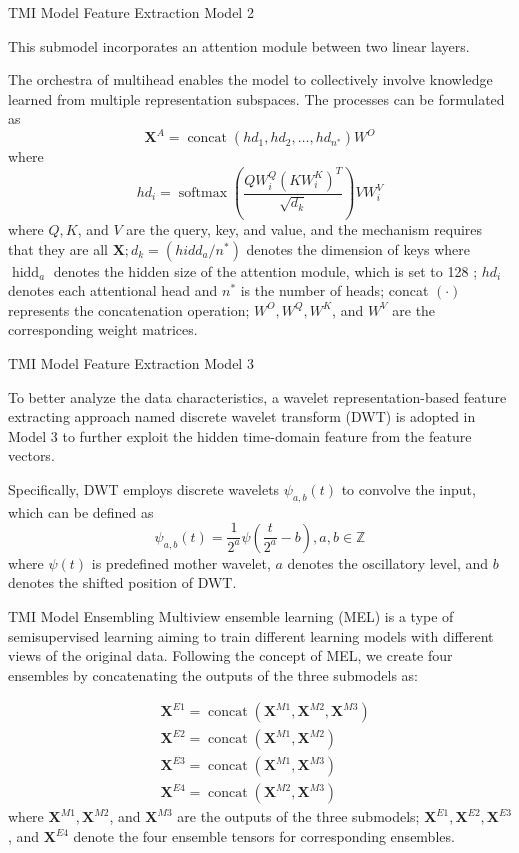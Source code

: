 \documentclass[UTF8]{beamer}
\begin{document}
\begin{frame}
{TMI Model}
{Feature Extraction}
{Model 2}

This submodel incorporates an attention module between two linear layers.

The orchestra of multihead enables the model to collectively involve knowledge learned from multiple representation subspaces. The processes can be formulated as
$$
\mathbf{X}^A=\operatorname{concat}\left(h d_1, h d_2, \ldots, h d_{n^*}\right) W^O
$$
where
$$
h d_i=\operatorname{softmax}\left(\frac{Q W_i^Q\left(K W_i^K\right)^T}{\sqrt{d_k}}\right) V W_i^V
$$
where $Q, K$, and $V$ are the query, key, and value, and the mechanism requires that they are all $\mathbf{X} ; d_k=\left(h i d d_a / n^*\right)$ denotes the dimension of keys where $\operatorname{hidd}_a$ denotes the hidden size of the attention module, which is set to 128 ; $h d_i$ denotes each attentional head and $n^*$ is the number of heads; concat $(\cdot)$ represents the concatenation operation; $W^O, W^Q, W^K$, and $W^V$ are the corresponding weight matrices.
\end{frame}

\begin{frame}
{TMI Model}
{Feature Extraction}
{Model 3}

To better analyze the data characteristics, a wavelet representation-based feature extracting approach named discrete wavelet transform (DWT) is adopted in Model 3 to further exploit the hidden time-domain feature from the feature vectors.

Specifically, DWT employs discrete wavelets $\psi_{a, b}(t)$ to convolve the input, which can be defined as
$$
\psi_{a, b}(t)=\frac{1}{2^a} \psi\left(\frac{t}{2^a}-b\right), a, b \in \mathbb{Z}
$$
where $\psi(t)$ is predefined mother wavelet, $a$ denotes the oscillatory level, and $b$ denotes the shifted position of DWT. 
\end{frame}

\begin{frame}
{TMI Model}
{Ensembling}
Multiview ensemble learning (MEL) is a type of semisupervised learning aiming to train different learning models with \alert{different views of the original data.}
Following the concept of MEL, we create four ensembles by concatenating the outputs of the three submodels as:

$$
\begin{aligned}
&\mathbf{X}^{E 1}=\operatorname{concat}\left(\mathbf{X}^{M 1}, \mathbf{X}^{M 2}, \mathbf{X}^{M 3}\right) \\
&\mathbf{X}^{E 2}=\operatorname{concat}\left(\mathbf{X}^{M 1}, \mathbf{X}^{M 2}\right) \\
&\mathbf{X}^{E 3}=\operatorname{concat}\left(\mathbf{X}^{M 1}, \mathbf{X}^{M 3}\right) \\
&\mathbf{X}^{E 4}=\operatorname{concat}\left(\mathbf{X}^{M 2}, \mathbf{X}^{M 3}\right)
\end{aligned}
$$ 
where $\mathbf{X}^{M 1}, \mathbf{X}^{M 2}$, and $\mathbf{X}^{M 3}$ are the outputs of the three submodels; $\mathbf{X}^{E 1}, \mathbf{X}^{E 2}, \mathbf{X}^{E 3}$, and $\mathbf{X}^{E 4}$ denote the four ensemble tensors for corresponding ensembles.
\end{frame}
\end{document}
